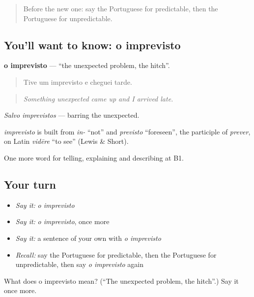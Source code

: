 \begin{quote}
Before the new one: say the Portuguese for predictable, then the Portuguese for unpredictable.
\end{quote}

\subsection*{You'll want to know: o imprevisto}
\textbf{o imprevisto} — \textquotedblleft{}the unexpected problem, the hitch\textquotedblright{}.

\begin{quote}
Tive um imprevisto e cheguei tarde.
\end{quote}

\begin{quote}
\emph{Something unexpected came up and I arrived late.}
\end{quote}

\emph{Salvo imprevistos} — barring the unexpected.

\begin{cousinweb}
\emph{imprevisto} is built from \emph{in-} \textquotedblleft{}not\textquotedblright{} and \emph{previsto} \textquotedblleft{}foreseen\textquotedblright{}, the participle of \emph{prever}, on Latin \emph{vidēre} \textquotedblleft{}to see\textquotedblright{} (Lewis \& Short).
\end{cousinweb}

\begin{grammarlens}[title={What you've built}]
One more word for telling, explaining and describing at B1.
\end{grammarlens}

\subsection*{Your turn}
\begin{itemize}
\raggedright
  \item \emph{Say it:} \emph{o imprevisto}
  \item \emph{Say it:} \emph{o imprevisto}, once more
  \item \emph{Say it:} a sentence of your own with \emph{o imprevisto}
  \item \emph{Recall:} say the Portuguese for predictable, then the Portuguese for unpredictable, then say \emph{o imprevisto} again
\end{itemize}

\begin{tcolorbox}[breakable,colback=teal!4,colframe=teal!35!black,title={Before you move on}]
What does o imprevisto mean? (\textquotedblleft{}The unexpected problem, the hitch\textquotedblright{}.) Say it once more.
\end{tcolorbox}
